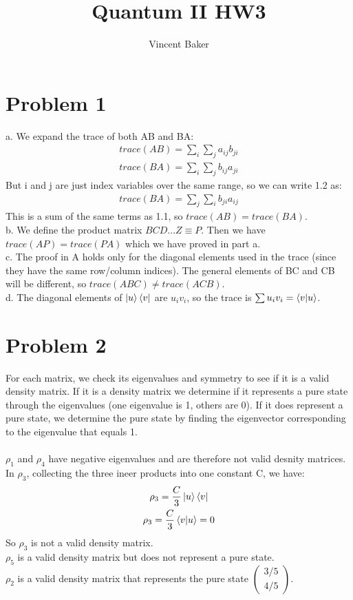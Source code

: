 \documentclass[a4paper,12pt]{article}
\title{Quantum II HW3}
\author{Vincent Baker}
\numberwithin{equation}{section}
\begin{document}
\maketitle

\section{Problem 1}
a. We expand the trace of both AB and BA:
\begin{gather}
 trace(AB)=\sum_i\sum_ja_{ij}b_{ji}\\
 trace(BA)=\sum_i\sum_jb_{ij}a_{ji}
\end{gather}
But i and j are just index variables over the same range, so we can write 1.2 as:
\begin{gather}
 trace(BA)=\sum_j\sum_ib_{ji}a_{ij}
\end{gather}
This is a sum of the same terms as 1.1, so $trace(AB)=trace(BA)$.\\
b. We define the product matrix $BCD...Z\equiv P$. 
Then we have $trace(AP)=trace(PA)$ which we have proved in part a.\\
c. The proof in A holds only for the diagonal elements used in the trace (since they have the same row/column indices).
The general elements of BC and CB will be different, so $trace(ABC)\ne trace(ACB)$.\\
d. The diagonal elements of $\ket{u}\bra{v}$ are $u_iv_i$, so the trace is $\sum u_iv_i=\braket{v|u}$.

\section{Problem 2}
For each matrix, we check its eigenvalues and symmetry to see if it is a valid density matrix. 
If it is a density matrix we determine if it represents a pure state through the eigenvalues (one eigenvalue is 1, others are 0).
If it does represent a pure state, we determine the pure state by finding the eigenvector corresponding to the eigenvalue that equals 1.\\ \\
$\rho_1$ and $\rho_4$ have negative eigenvalues and are therefore not valid desnity matrices.
\\In $\rho_3$, collecting the three ineer products into one constant C, we have:
\begin{gather}
 \rho_3=\frac{C}{3}\ket{u}\bra{v}\\
 \rho_3=\frac{C}{3}\braket{v|u}=0
\end{gather}
So $\rho_3$ is not a valid density matrix.\\
$\rho_5$ is a valid density matrix but does not represent a pure state.\\
$\rho_2$ is a valid density matrix that represents the pure state $\left(\begin{smallmatrix}3/5\\4/5  \end{smallmatrix}\right)$.
\end{document}
